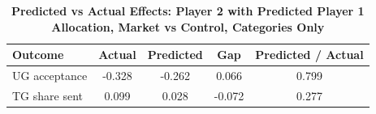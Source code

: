 \begin{table}[!htbp]
\centering
\caption{\textbf{Predicted vs Actual Effects: Player 2 with Predicted Player 1 Allocation, Market vs Control, Categories Only}}
\label{tab:cats_only_market_vs_control_predsender_fullpooled_p2_fit}
\begin{tabular}{lcccc}
\toprule
Outcome & Actual & Predicted & Gap & Predicted / Actual \\
\midrule
UG acceptance & -0.328 & -0.262 & 0.066 & 0.799 \\
TG share sent & 0.099 & 0.028 & -0.072 & 0.277 \\
\bottomrule
\end{tabular}
\end{table}
